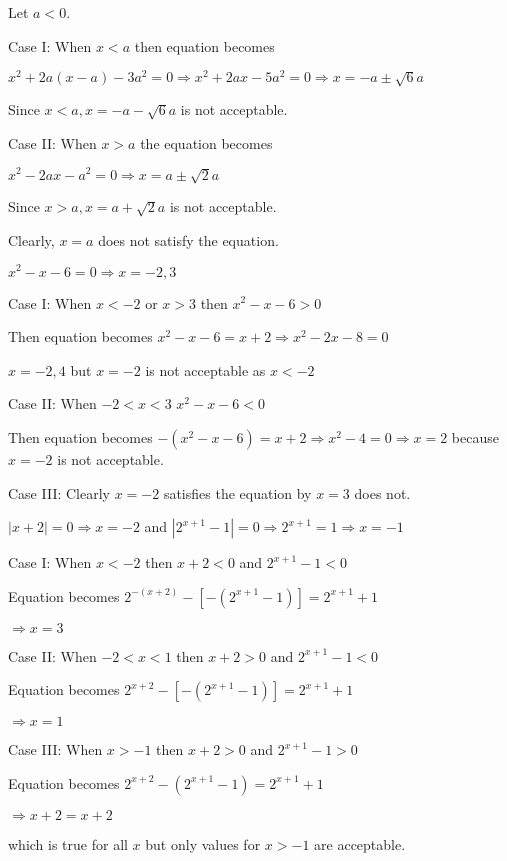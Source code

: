   Let $a < 0$.

  Case I: When $x < a$ then equation becomes

  $x^2 + 2a(x - a) - 3a^2 = 0 \Rightarrow x^2 + 2ax - 5a^2 = 0 \Rightarrow x = -a \pm \sqrt{6}a$

  Since $x < a, x = -a - \sqrt{6}a$  is not acceptable.

  Case II: When $x > a$ the equation becomes

  $x^2 - 2ax - a^2 = 0 \Rightarrow x = a \pm \sqrt{2}a$

  Since $x > a, x = a + \sqrt{2}a$ is not acceptable.

  Clearly, $x = a$ does not satisfy the equation.
\item $x^2 - x - 6 = 0 \Rightarrow x = -2, 3$

  Case I: When $x < -2$ or $x > 3$ then $x^2 - x - 6 > 0$

  Then equation becomes $x^2 - x - 6 = x + 2 \Rightarrow x^2 - 2x - 8 = 0$

  $x = -2, 4$ but $x = -2$ is not acceptable as $x < -2$

  Case II: When $-2 < x < 3$ $x^2 - x - 6 < 0$

  Then equation becomes $-(x^2 - x - 6) = x + 2 \Rightarrow x^2 - 4 = 0 \Rightarrow x = 2$ because $x =
  -2$ is not acceptable.

  Case III: Clearly $x = -2$ satisfies the equation by $x = 3$ does not.
\item $|x + 2| = 0 \Rightarrow x = -2$ and $|2^{x + 1} - 1| = 0 \Rightarrow 2^{x + 1} = 1 \Rightarrow x = -1$

  Case I: When $x < -2$ then $x + 2 < 0$ and $2^{x + 1} - 1 < 0$

  Equation becomes $2^{-(x + 2)} - [-(2^{x + 1} - 1)] = 2^{x + 1} + 1$

  $\Rightarrow x = 3$

  Case II: When $-2 < x < 1$ then $x + 2 > 0$ and $2^{x + 1} - 1 < 0$

  Equation becomes $2^{x + 2} - [-(2^{x + 1} - 1)] = 2^{x + 1} + 1$

  $\Rightarrow x = 1$

  Case III: When $x > -1$ then $x + 2 > 0$ and $2^{x + 1} - 1 > 0$

  Equation becomes $2^{x + 2} - (2^{x + 1} - 1) = 2^{x + 1} + 1$

  $\Rightarrow x + 2 = x + 2$

  which is true for all $x$ but only values for $x > -1$ are acceptable.

